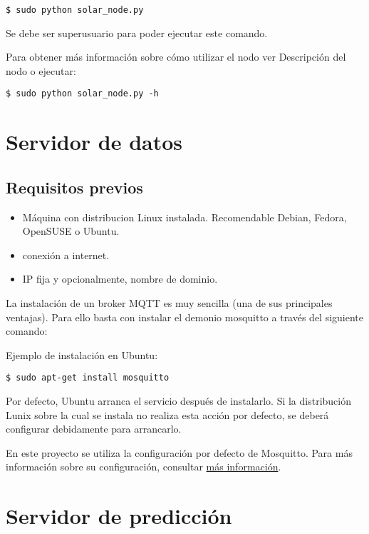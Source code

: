 \lstset{language=bash}
\begin{lstlisting}[frame=single]
$ sudo python solar_node.py
\end{lstlisting}

Se debe ser superusuario para poder ejecutar este comando.

Para obtener más información sobre cómo utilizar el nodo ver Descripción del nodo o ejecutar:

\lstset{language=bash}
\begin{lstlisting}[frame=single]
$ sudo python solar_node.py -h
\end{lstlisting}

\section{Servidor de datos}
\label{makereference7.2}
\subsection{Requisitos previos}
\label{makereference7.3}
\begin{itemize}
\item Máquina con distribucion Linux instalada. Recomendable Debian, Fedora, OpenSUSE o Ubuntu.
\item conexión a internet.
\item IP fija y opcionalmente, nombre de dominio.
\end{itemize}

La instalación de un broker MQTT es muy sencilla (una de sus principales ventajas). Para ello basta con instalar el demonio mosquitto a través del siguiente comando:

Ejemplo de instalación en Ubuntu:
\lstset{language=bash}
\begin{lstlisting}[frame=single]
$ sudo apt-get install mosquitto
\end{lstlisting}

Por defecto, Ubuntu arranca el servicio después de instalarlo. Si la distribución Lunix sobre la cual se instala no realiza esta acción por defecto, se deberá configurar debidamente para arrancarlo.

En este proyecto se utiliza la configuración por defecto de Mosquitto. Para más información sobre su configuración, consultar \href{https://www.digitalocean.com/community/tutorials/how-to-install-and-secure-the-mosquitto-mqtt-messaging-broker-on-ubuntu-16-04}{más información}.

\section{Servidor de predicción}
\label{makereference7.3}


